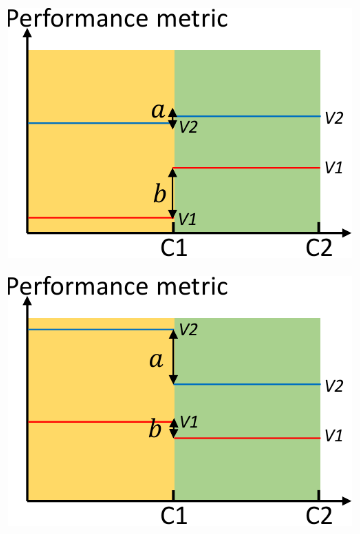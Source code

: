 \begin{figure}[t]
\begin{subfigure}{0.22\textwidth}
                \caption{}
                \label{fig:description-b}
        \end{subfigure}
        \begin{subfigure}{0.22\textwidth}
                \includegraphics[width=\linewidth]{Figures/background-c.pdf}
                \caption{}
                \label{fig:description-c}
        \end{subfigure}%
        \begin{subfigure}{0.22\textwidth}
                \includegraphics[width=\linewidth]{Figures/background-d.pdf}
                \caption{}

\end{subfigure}
\end{figure}

